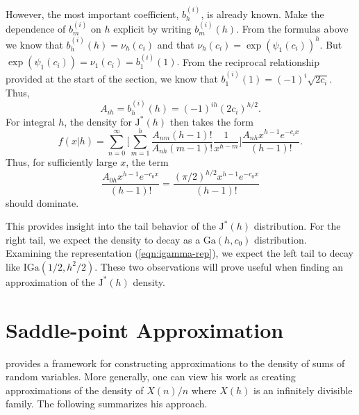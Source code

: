 \documentclass[12pt]{article}
\newcommand{\JJ}{\text{J}^*}
\newcommand{\Ga}{\mbox{Ga}}
\newcommand{\IGa}{\mbox{IGa}}
\begin{document}
However, the most important coefficient, $b_h^{(i)}$, is already known.  Make
the dependence of $b_m^{(i)}$ on $h$ explicit by writing $b_m^{(i)}(h)$.  From
the formulas above we know that \( b_h^{(i)}(h) = \nu_h(c_i) \) and that \(
\nu_h(c_i) = \exp(\psi_1(c_i))^h.  \) But \( \exp(\psi_1(c_i)) = \nu_1(c_i) =
b_1^{(i)}(1).  \) From the reciprocal relationship provided at the start of the
section, we know that \( b_1^{(i)}(1) = (-1)^i \sqrt{2 c_i}.  \) Thus,
\[
A_{ih} = b_h^{(i)}(h) = (-1)^{ih} (2 c_i)^{h/2}.
\]
For integral $h$, the density for $\JJ(h)$ then takes the form
\[
f(x|h) = \sum_{n=0}^\infty
\Big[ \sum_{m=1}^h \frac{A_{nm} (h-1)! }{A_{nh} (m-1)!} \frac{1}{x^{h-m}} \Big]
\frac{A_{nh} x^{h-1} e^{-c_i x}}{(h-1)!}.
\]
Thus, for sufficiently large $x$, the term 
\[
\frac{A_{0h} x^{h-1} e^{-c_0 x}}{(h-1)!} = \frac{(\pi/2)^{h/2} x^{h-1} e^{-c_0 x}}{(h-1)!}
\]
should dominate.  

\begin{remark}
\label{remark:tails}
This provides insight into the tail behavior of the $\JJ(h)$ distribution.  For
the right tail, we expect the density to decay as a $\Ga(h,c_0)$ distribution.
Examining the representation (\ref{eqn:igamma-rep}), we expect the left tail to
decay like $\IGa(1/2, h^2/2)$.  These two observations will prove useful when
finding an approximation of the $\JJ(h)$ density.
\end{remark}


\section{Saddle-point Approximation}
\label{sec:largeb}

\cite{daniels-1954} provides a framework for constructing approximations to the
density of sums of random variables.  More generally, one can view his work as
creating approximations of the density of $X(n) / n$ where $X(h)$ is an
infinitely divisible family.  The following summarizes his approach.
\end{document}
